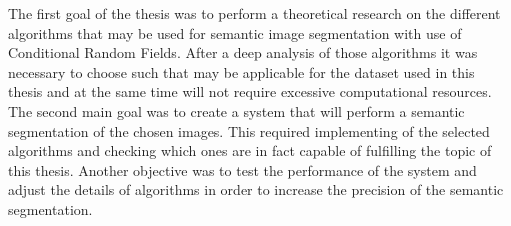 The first goal of the thesis was to perform a theoretical research on the different algorithms that may be used for semantic image segmentation with use of Conditional Random Fields. After a deep analysis of those algorithms it was necessary to choose such that may be applicable for the dataset used in this thesis and at the same time will not require excessive computational resources. The second main goal was to create a system that will perform a semantic segmentation of the chosen images. This required implementing of the selected algorithms and checking which ones are in fact capable of fulfilling the topic of this thesis. Another objective was to test the performance of the system and adjust the details of algorithms in order to increase the precision of the semantic segmentation. 